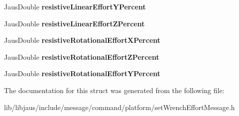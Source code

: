 \begin{DoxyCompactItemize}
\item 
\hypertarget{struct_set_wrench_effort_message_struct_a5e754b922856d726c29b5ee0d9e0f8b8}{\-Jaus\-Double {\bfseries resistive\-Linear\-Effort\-Y\-Percent}}\label{struct_set_wrench_effort_message_struct_a5e754b922856d726c29b5ee0d9e0f8b8}

\item 
\hypertarget{struct_set_wrench_effort_message_struct_af517e6ae151d1be45d970a7a709e1582}{\-Jaus\-Double {\bfseries resistive\-Linear\-Effort\-Z\-Percent}}\label{struct_set_wrench_effort_message_struct_af517e6ae151d1be45d970a7a709e1582}

\item 
\hypertarget{struct_set_wrench_effort_message_struct_a25537eee3947d3c629dd9654c9597f47}{\-Jaus\-Double {\bfseries resistive\-Rotational\-Effort\-X\-Percent}}\label{struct_set_wrench_effort_message_struct_a25537eee3947d3c629dd9654c9597f47}

\item 
\hypertarget{struct_set_wrench_effort_message_struct_a0459e3d23b2e96df6c7cb280226399fd}{\-Jaus\-Double {\bfseries resistive\-Rotational\-Effort\-Z\-Percent}}\label{struct_set_wrench_effort_message_struct_a0459e3d23b2e96df6c7cb280226399fd}

\item 
\hypertarget{struct_set_wrench_effort_message_struct_a39eddbc5fa2168bc7b6738f21275556b}{\-Jaus\-Double {\bfseries resistive\-Rotational\-Effort\-Y\-Percent}}\label{struct_set_wrench_effort_message_struct_a39eddbc5fa2168bc7b6738f21275556b}

\end{DoxyCompactItemize}


\-The documentation for this struct was generated from the following file\-:\begin{DoxyCompactItemize}
\item 
lib/libjaus/include/message/command/platform/set\-Wrench\-Effort\-Message.\-h\end{DoxyCompactItemize}
